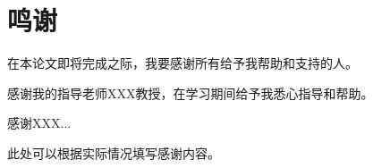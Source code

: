 \chapter{鸣\quad 谢}

在本论文即将完成之际，我要感谢所有给予我帮助和支持的人。

感谢我的指导老师XXX教授，在学习期间给予我悉心指导和帮助。

感谢XXX...

此处可以根据实际情况填写感谢内容。
